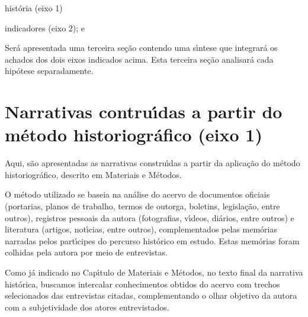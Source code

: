 \documentclass[
12pt,		%
openright,	%
twoside,  %
a4paper,			%
chapter=TITLE,		%
english,			%
french,				%
spanish,			%
brazil				%
]{USPSC-classe/USPSC}
\begin{document}
\begin{alineas}
\item hist\'oria (eixo 1)
\item indicadores (eixo 2); e
\end{alineas}

Ser\'a apresentada uma terceira se\c{c}\~ao contendo uma s\'{\i}ntese que integrar\'a os achados dos dois eixos indicados acima. Esta terceira se\c{c}\~ao analisar\'a cada hip\'otese separadamente.









\section[Narrativas contru\'{\i}das a partir do m\'etodo historiogr\'afico (eixo 1)]{Narrativas contru\'{\i}das a partir do m\'etodo historiogr\'afico (eixo 1)}\label{Narrativas contru\'{\i}das a partir do m\'etodo historiogr\'afico (eixo 1)}
Aqui, s\~ao apresentadas as narrativas constru\'{\i}das a partir da aplica\c{c}\~ao do m\'etodo historiogr\'afico, descrito em Materiais e M\'etodos.









O m\'etodo utilizado se baseia na an\'alise do acervo de documentos oficiais (portarias, planos de trabalho, termos de outorga, boletins, legisla\c{c}\~ao, entre outros), registros pessoais da autora (fotografias, v\'{\i}deos, di\'arios, entre outros) e literatura (artigos, not\'{\i}cias, entre outros), complementados pelas mem\'orias narradas pelos part\'{\i}cipes do percurso hist\'orico em estudo. Estas mem\'orias foram colhidas pela autora por meio de entrevistas.









Como j\'a indicado no Cap\'{\i}tulo de Materiais e M\'etodos, no texto final da narrativa hist\'orica, buscamos intercalar conhecimentos obtidos do acervo com trechos selecionados das entrevistas citadas, complementando o olhar objetivo da autora com a subjetividade dos atores entrevistados.
\end{document}
